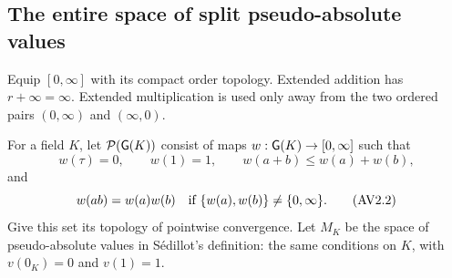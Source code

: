 \subsection{The entire space of split pseudo-absolute values}

Equip $[0,\infty]$ with its compact order topology. Extended addition has
$r+\infty=\infty$. Extended multiplication is used only away from the two
ordered pairs $(0,\infty)$ and $(\infty,0)$.

\begin{definition}
For a field $K$, let $\mathcal P(\mathsf G(K))$ consist of maps
$w:\mathsf G(K)\to[0,\infty]$ such that
\[
 w(\tau)=0,\qquad w(1)=1,\qquad
 w(a+b)\le w(a)+w(b),
 \tag{AV2.1}\label{eq:split-pav}
\]
and
\[
 w(ab)=w(a)w(b)\quad\hbox{if }
 \{w(a),w(b)\}\ne\{0,\infty\}.
 \tag{AV2.2}\label{eq:partial-mult}
\]
Give this set its topology of pointwise convergence. Let $M_K$ be the
space of pseudo-absolute values in S\'edillot's definition: the same
conditions on $K$, with $v(0_K)=0$ and $v(1)=1$.
\end{definition}

